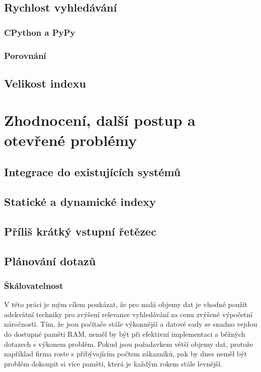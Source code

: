 \documentclass[12pt,letterpaper,oneside,openright]{book}
\begin{document}
\section{Rychlost vyhledávání}
\subsection{CPython a PyPy}
\subsection{Porovnání}

\section{Velikost indexu}

\chapter{Zhodnocení, další postup a otevřené problémy}
\section{Integrace do existujících systémů}
\section{Statické a dynamické indexy}
\section{Příliš krátký vstupní řetězec}
\section{Plánování dotazů}
\subsection{Škálovatelnost}
V této práci je mým cílem poukázat, že pro malá objemy dat je vhodné použít
adekvátní techniky pro zvýšení relevance vyhledávání za cenu zvýšené výpočetní
náročnosti. Tím, že jsou počítače stále výkonnější a datové sady se snadno
vejdou do dostupné paměti RAM, neměl by být při efektivní implementaci a
běžných dotazech s výkonem problém. Pokud jsou požadavkem větší objemy dat,
protože například firma roste s přibývajícím počtem zákazníků, pak by dnes
neměl být problém dokoupit si více paměti, která je každým rokem stále levnější.
\end{document}
